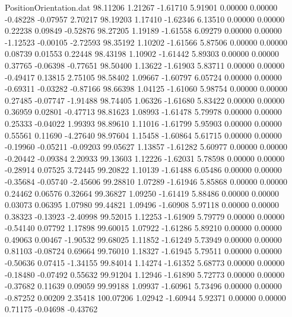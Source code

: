 \begin{filecontents}{PositionOrientation.dat}
  98.11206    1.21267   -1.61710     5.91901    0.00000    0.00000   -0.48228   -0.07957    2.70217
  98.19203    1.17410   -1.62346     6.13510    0.00000    0.00000    0.22238    0.09849   -0.52876
  98.27205    1.19189   -1.61558     6.09279    0.00000    0.00000   -1.12523   -0.00105   -2.72593
  98.35192    1.10202   -1.61566     5.87506    0.00000    0.00000    0.08739    0.01553    0.22448
  98.43198    1.10902   -1.61442     5.89303    0.00000    0.00000    0.37765   -0.06398   -0.77651
  98.50400    1.13622   -1.61903     5.83711    0.00000    0.00000   -0.49417    0.13815    2.75105
  98.58402    1.09667   -1.60797     6.05724    0.00000    0.00000   -0.69311   -0.03282   -0.87166
  98.66398    1.04125   -1.61060     5.98754    0.00000    0.00000    0.27485   -0.07747   -1.91488
  98.74405    1.06326   -1.61680     5.83422    0.00000    0.00000    0.36959    0.02801   -0.47713
  98.81623    1.08993   -1.61478     5.79978    0.00000    0.00000    0.25333   -0.04022    1.99393
  98.89610    1.11016   -1.61799     5.95903    0.00000    0.00000    0.55561    0.11690   -4.27640
  98.97604    1.15458   -1.60864     5.61715    0.00000    0.00000   -0.19960   -0.05211   -0.09203
  99.05627    1.13857   -1.61282     5.60977    0.00000    0.00000   -0.20442   -0.09384    2.20933
  99.13603    1.12226   -1.62031     5.78598    0.00000    0.00000   -0.28914    0.07525    3.72445
  99.20822    1.10139   -1.61488     6.05486    0.00000    0.00000   -0.35684   -0.05740   -2.45606
  99.28810    1.07289   -1.61946     5.85868    0.00000    0.00000    0.24462    0.06576    0.32664
  99.36827    1.09250   -1.61419     5.88486    0.00000    0.00000    0.03073    0.06395    1.07980
  99.44821    1.09496   -1.60908     5.97118    0.00000    0.00000    0.38323   -0.13923   -2.40998
  99.52015    1.12253   -1.61909     5.79779    0.00000    0.00000   -0.54140    0.07792    1.17898
  99.60015    1.07922   -1.61286     5.89210    0.00000    0.00000    0.49063    0.00467   -1.90532
  99.68025    1.11852   -1.61249     5.73949    0.00000    0.00000    0.81103   -0.08724    0.69664
  99.76010    1.18327   -1.61945     5.79511    0.00000    0.00000   -0.50636    0.07415   -1.34155
  99.84014    1.14274   -1.61352     5.68773    0.00000    0.00000   -0.18480   -0.07492    0.55632
  99.91204    1.12946   -1.61890     5.72773    0.00000    0.00000   -0.37682    0.11639    0.09059
  99.99188    1.09937   -1.60961     5.73496    0.00000    0.00000   -0.87252    0.00209    2.35418
 100.07206    1.02942   -1.60944     5.92371    0.00000    0.00000    0.71175   -0.04698   -0.43762

\end{filecontents}

